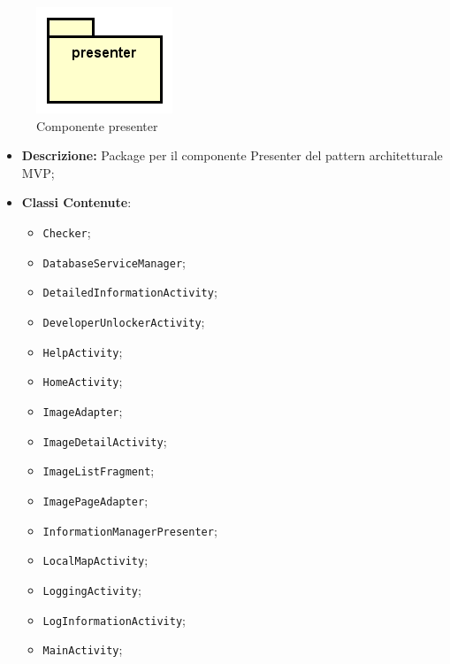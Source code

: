 \documentclass[../DefinizioneDiProdotto.tex]{subfiles}
\begin{document}
    \begin{figure}[H]
        \centering
        \includegraphics{img/package/presenter.png}
        \caption{Componente presenter}\label{fig:presenter} 
    \end{figure}
    \begin{itemize}
\item \textbf{Descrizione:} Package per il componente Presenter del pattern architetturale MVP;
\item \textbf{Classi Contenute}:
\begin{itemize}
\item \texttt{Checker};

\item \texttt{DatabaseServiceManager};

\item \texttt{DetailedInformationActivity};

\item \texttt{DeveloperUnlockerActivity};

\item \texttt{HelpActivity};

\item \texttt{HomeActivity};

\item \texttt{ImageAdapter};

\item \texttt{ImageDetailActivity};

\item \texttt{ImageListFragment};

\item \texttt{ImagePageAdapter};

\item \texttt{InformationManagerPresenter};

\item \texttt{LocalMapActivity};

\item \texttt{LoggingActivity};

\item \texttt{LogInformationActivity};

\item \texttt{MainActivity};


\end{itemize}
\end{itemize}
\end{document}
